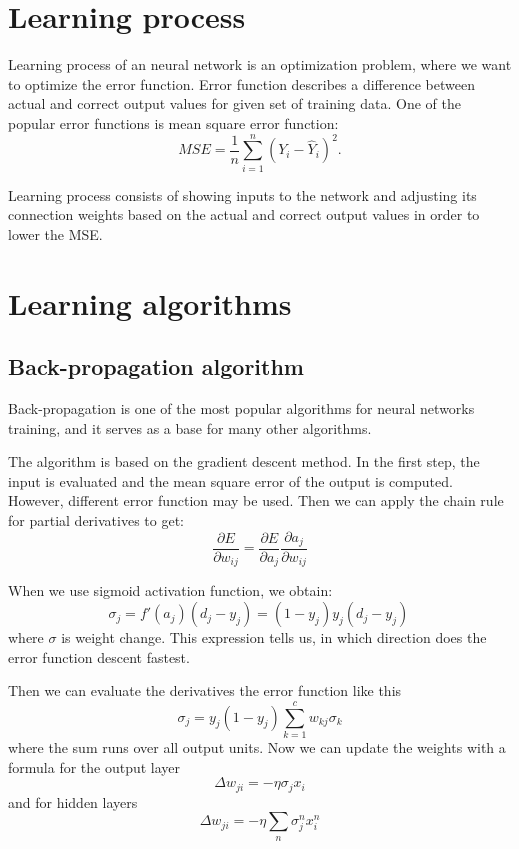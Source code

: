 \begin{description}
\section{Learning process}
Learning process of an neural network is an optimization problem, where we want to optimize the error function. Error function describes a difference between actual and correct output values for given set of training data. One of the popular error functions is mean square error function:
\begin{equation*}
MSE  =  \frac{1}{n} \sum_{i=1}^{n} (Y_{i} - \hat{Y}_{i})^2.
\end{equation*}

Learning process consists of showing inputs to the network and adjusting its connection weights based on the actual and correct output values in order to lower the MSE.

\section{Learning algorithms}

\subsection{Back-propagation algorithm}
Back-propagation is one of the most popular algorithms for neural networks training, and it serves as a base for many other algorithms.

The algorithm is based on the gradient descent method. In the first step, the input is evaluated and the mean square error of the output is computed. However, different error function may be used. Then we can apply the chain rule for partial derivatives to get:
\begin{equation*}
\frac{\partial E}{\partial w_{ij}} = \frac{\partial E}{\partial a_{j}} \frac{\partial a_{j}}{\partial w_{ij}}
\end{equation*}

When we use sigmoid activation function, we obtain:
\begin{equation*}
\sigma_{j}  =  f'(a_{j})(d_{j} - y_{j}) = (1-y_{j})y_{j}(d_{j}-y_{j})\,
\end{equation*}
where $\sigma$ is weight change. This expression tells us, in which direction does the error function descent fastest.

Then we can evaluate the derivatives the error function like this
\begin{equation*}
\sigma_{j} = y_{j}(1-y_{j}) \sum_{k=1}^{c} w_{kj} \sigma_{k}
\end{equation*}
where the sum runs over all output units. Now we can update the weights with a formula for the output layer
\begin{equation*}
\Delta w_{ji} = - \eta \sigma_{j} x_{i}
\end{equation*}
and for hidden layers
\begin{equation*}
\Delta w_{ji} =  - \eta \sum_{n} \sigma_{j}^{n} x_{i}^{n}
\end{equation*}


\end{description}
